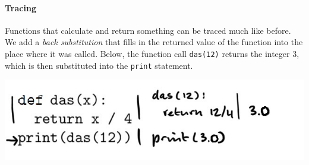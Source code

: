 %
%
%

%

\paragraph{Tracing}

Functions that calculate and return something can be traced much like before. We add a \emph{back substitution} that fills in the returned value of the function into the place where it was called. Below, the function call \texttt{das(12)} returns the integer 3, which is then substituted into the \texttt{print} statement.

\includegraphics[width=.7\textwidth]{6-trace-returns.jpeg}
